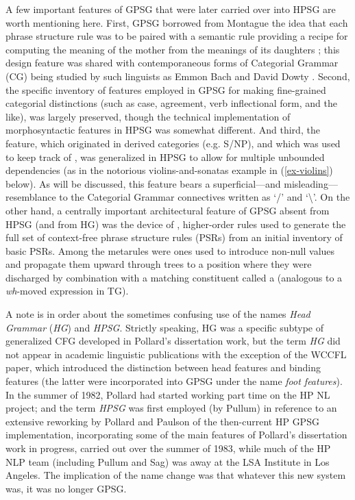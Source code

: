 \documentclass[output=paper
 	        ,biblatex
                ,babelshorthands
                ,newtxmath
                ,draftmode
                ,colorlinks, citecolor=brown
]{langscibook}
\begin{document}
A few important features of GPSG that were later carried over into HPSG are worth mentioning here. First, GPSG borrowed from Montague the idea that each phrase structure rule was to be paired with a semantic rule providing a recipe for computing the meaning of the mother from the meanings of its daughters \citep[]{Gazdar81a}; this design feature was shared with contemporaneous forms of Categorial Grammar (CG) being studied by such linguists as Emmon Bach \citep{Bach79a,Bach80a} and David Dowty \citep{Dowty82a-u,Dowty82b}.  Second, the specific inventory of features employed in GPSG for making fine-grained categorial distinctions (such as case, agreement, verb inflectional form, and the like), was largely preserved, though the technical implementation of morphosyntactic features in HPSG was somewhat different. And third, the \slasch feature, which originated in  derived categories (e.g. S/NP), and which was used to keep track of , was generalized in HPSG to allow for multiple unbounded dependencies (as in the notorious violins-and-sonatas example in (\ref{ex-violins}) below). As will be discussed, this \slasch feature bears a superficial---and misleading---resemblance to the Categorial Grammar connectives written as `/' and `\textbackslash'. On the other hand, a centrally important architectural feature of GPSG absent from HPSG (and from HG) was the device of , higher-order rules used to generate the full set of context-free phrase structure rules (PSRs) from an initial inventory of basic PSRs. Among the metarules were ones used to introduce non-null \slasch values and propagate them upward through trees to a position where they were discharged by combination with a matching constituent called a  (analogous to a \emph{wh}-moved expression in TG).

A note is in order about the sometimes confusing use of the names \emph{Head Grammar} (\emph{HG}) and \emph{HPSG}. Strictly speaking, HG was a specific subtype of generalized CFG developed in Pollard's dissertation work, but the term \emph{HG} did not appear in academic linguistic publications with the exception of the \citet{PollardSag1983} WCCFL paper, which introduced the distinction between head features and binding features (the latter were incorporated into GPSG under the name \emph{foot features}). In the summer of 1982, Pollard had started working part time on the HP NL project; and the term \emph{HPSG} was first employed (by Pullum) in reference to an extensive reworking by Pollard and Paulson of the then-current HP GPSG implementation, incorporating some of the main features of Pollard's dissertation work in progress, carried out over the summer of 1983, while much of the HP NLP team (including Pullum and Sag) was away at the LSA Institute in Los Angeles.  The implication of the name change was that whatever this new system was, it was no longer GPSG.
\end{document}
